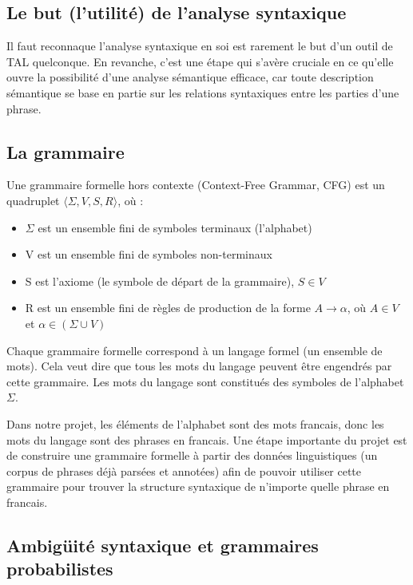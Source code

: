 \documentclass[12pt]{article}
\begin{document}
\subsection{Le but (l'utilit\'e) de l'analyse syntaxique}

Il faut reconna que l'analyse syntaxique en soi est rarement le but d'un outil de
TAL quelconque. En revanche, c'est une \'etape qui s'av\`ere cruciale en ce qu'elle ouvre la possibilit\'e d'une analyse s\'emantique efficace, car toute description
s\'emantique se base en partie sur les relations syntaxiques entre les parties d'une
phrase.

\subsection{La grammaire}

Une grammaire formelle hors contexte (Context-Free Grammar, CFG) est un
quadruplet $\langle \Sigma, V, S, R \rangle$, o\`u :
\begin{itemize}
\item $\Sigma$ est un ensemble fini de symboles terminaux (l'alphabet)
\item V est un ensemble fini de symboles non-terminaux
\item S est l'axiome (le symbole de d\'epart de la grammaire), $S \in V$
\item R est un ensemble fini de r\`egles de production de la forme $A
\rightarrow \alpha$, o\`u $A \in V$ et $\alpha \in (\Sigma \cup V)$
\end{itemize}

Chaque grammaire formelle correspond \`a un langage formel (un ensemble de mots).
Cela veut dire que tous les mots du langage peuvent \^etre engendr\'es par cette
grammaire. Les mots du langage sont constitu\'es des symboles de l'alphabet
$\Sigma$.\par

Dans notre projet, les \'el\'ements de l'alphabet sont des mots francais, donc les
mots du langage sont des phrases en francais. Une \'etape importante du projet est de construire
une grammaire formelle \`a partir des donn\'ees linguistiques (un corpus de phrases
d\'ej\`a pars\'ees et annot\'ees) afin de pouvoir utiliser cette grammaire pour trouver
la structure syntaxique de n'importe quelle phrase en francais.

\subsection{Ambig\"uit\'e syntaxique et grammaires probabilistes}
\end{document}
